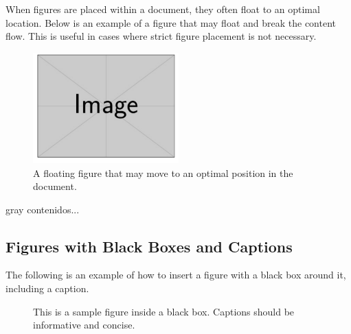 When figures are placed within a document, they often float to an optimal location. Below is an example of a figure that may float and break the content flow. This is useful in cases where strict figure placement is not necessary.

\begin{figure}[htbp]
    \centering
    \includegraphics[width=0.5\textwidth]{figures/sample_image.png}
    \caption{A floating figure that may move to an optimal position in the document.}
    \label{fig::floating_figure}
\end{figure}

\begin{color}{gray}
  \lipsum[1]  %
  \lipsum[2]	contenidos...
\end{color}


\subsection{Figures with Black Boxes and Captions}

The following is an example of how to insert a figure with a black box around it, including a caption.

\begin{figure}[H]
    \centering
    \caption{This is a sample figure inside a black box. Captions should be informative and concise.}
    \label{fig::sample_figure}
\end{figure}

